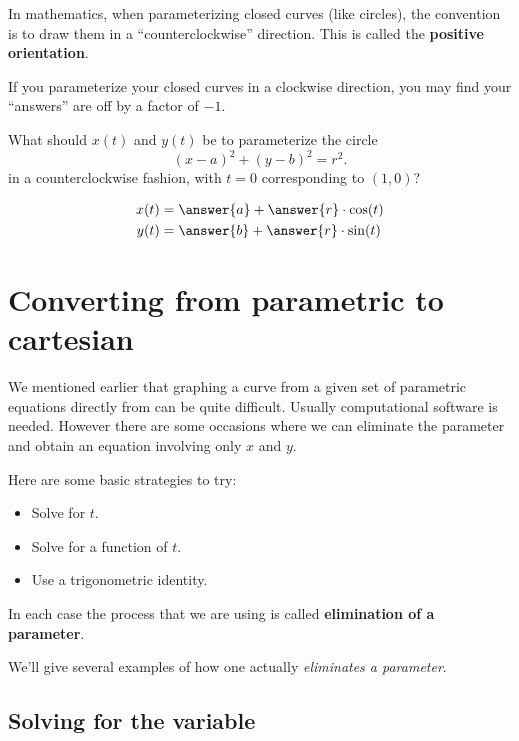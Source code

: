 \documentclass{ximera}
\begin{document}
In mathematics, when parameterizing closed curves (like circles), the
convention is to draw them in a ``counterclockwise'' direction. This
is called the \textbf{positive orientation}.

\begin{warning}
  If you parameterize your closed curves in a clockwise direction, you
  may find your ``answers'' are off by a factor of $-1$.
\end{warning}

\begin{question}
What should $x(t)$ and $y(t)$ be to parameterize the circle
\[
(x-a)^2 + (y-b)^2 = r^2.
\]
in a counterclockwise fashion, with $t=0$ corresponding to $(1,0)$?
\begin{prompt}
  \begin{align*}
    x(t) &= \answer{a} + \answer{r}\cdot \cos(t)\\
    y(t) &= \answer{b} + \answer{r}\cdot \sin(t)
  \end{align*}
\end{prompt}
\end{question}




\section{Converting from parametric to cartesian }

We mentioned earlier that graphing a curve from a  given set of parametric equations directly from can be quite difficult. Usually computational software is needed. However there are some occasions where we can eliminate the parameter and obtain an equation involving only $x$ and $y$.

Here are some basic strategies to try:
\begin{itemize}
\item Solve for $t$.
\item Solve for a function of $t$.
\item Use a trigonometric identity.
\end{itemize}
In each case the process that we are using is called
\textbf{elimination of a parameter}.

We'll give several examples of how one actually \textit{eliminates a
  parameter}.

\subsection{Solving for the variable}
\end{document}
